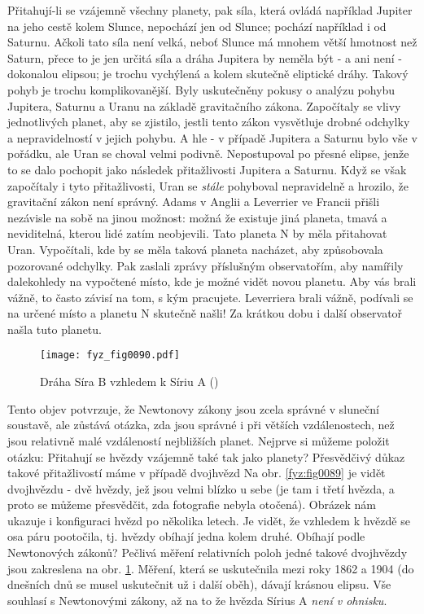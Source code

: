     Při\-ta\-hují-li se vzájemně všechny planety, pak síla, která ovládá například Jupiter na jeho 
    cestě kolem Slunce, nepochází jen od Slunce; pochází například i od Saturnu. Ačkoli tato síla 
    není velká, neboť Slunce má mnohem větší hmotnost než Saturn, přece to je jen určitá síla a 
    dráha Jupitera by neměla být - a ani není - dokonalou elipsou; je trochu vychýlená a 
     kolem skutečně eliptické dráhy. Takový pohyb je trochu komplikovanější. Byly 
    uskutečněny pokusy o analýzu pohybu Jupitera, Saturnu a Uranu na základě gravitačního zákona. 
    Započítaly se vlivy jednotlivých planet, aby se zjistilo, jestli tento zákon vysvětluje drobné 
    odchylky a nepravidelností v jejich pohybu. A hle - v případě Jupitera a Saturnu bylo vše v 
    pořádku, ale Uran se choval velmi podivně. Nepostupoval po přesné elipse, jenže to se dalo 
    pochopit jako následek přitažlivosti Jupitera a Saturnu. Když se však započítaly i tyto 
    přitažlivosti, Uran se \emph{stále} pohyboval nepravidelně a hrozilo, že gravitační zákon není 
    správný. Adams v Anglii a Leverrier ve Francii přišli nezávisle na sobě na jinou možnost: možná 
    že existuje jiná planeta, tmavá a neviditelná, kterou lidé zatím neobjevili. Tato planeta N by 
    měla přitahovat Uran. Vypočítali, kde by se měla taková planeta nacházet, aby způsobovala 
    pozorované odchylky. Pak zaslali zprávy příslušným observatořím, aby namířily dalekohledy na 
    vypočtené místo, kde je možné vidět novou planetu. Aby vás brali vážně, to často závisí na tom, 
    s kým pracujete. Leverriera brali vážně, podívali se na určené místo a planetu N skutečně 
    našli! Za krátkou dobu i další observatoř našla tuto planetu.

    \begin{figure}[ht!]  %
      \centering
      \texttt{[image: fyz\_fig0090.pdf]}
      \caption{Dráha Síra B vzhledem k Síriu A (\cite[s.~99]{Feynman01})}
      \label{fyz:fig0090}
    \end{figure}

    Tento objev potvrzuje, že Newtonovy zákony jsou zcela správné v sluneční soustavě, ale zůstává 
    otázka, zda jsou správné i při větších vzdálenostech, než jsou relativně malé vzdáleností 
    nejbližších planet. Nejprve si můžeme položit otázku: Přitahují se hvězdy vzájemně také tak 
    jako planety? Přesvědčivý důkaz takové přitažlivostí máme v případě dvojhvězd Na obr. 
    \ref{fyz:fig0089} je vidět dvojhvězdu - dvě hvězdy, jež jsou velmi blízko u sebe (je tam i třetí 
    hvězda, a proto se můžeme přesvědčit, zda fotografie nebyla otočená). Obrázek nám ukazuje i 
    konfiguraci hvězd po několika letech. Je vidět, že vzhledem k  hvězdě se osa páru 
    pootočila, tj. hvězdy obíhají jedna kolem druhé. Obíhají podle Newtonových zákonů? Pečlivá 
    měření relativních poloh jedné takové dvojhvězdy jsou zakreslena na obr. \ref{fyz:fig0090}. 
    Měření, která se uskutečnila mezi roky \num{1862} a \num{1904} (do dnešních dnů se musel 
    uskutečnit už i další oběh), dávají krásnou elipsu. Vše souhlasí s Newtonovými zákony, až na to 
    že hvězda Sírius A \emph{není v ohnisku}.  

